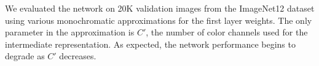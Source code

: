 We evaluated the network on 20K validation images from the ImageNet12 dataset using various monochromatic approximations for the first layer weights. 
The only parameter in the approximation is $C'$, the number of color channels used for the intermediate representation. As expected, the network performance begins to degrade as $C'$ decreases. 




